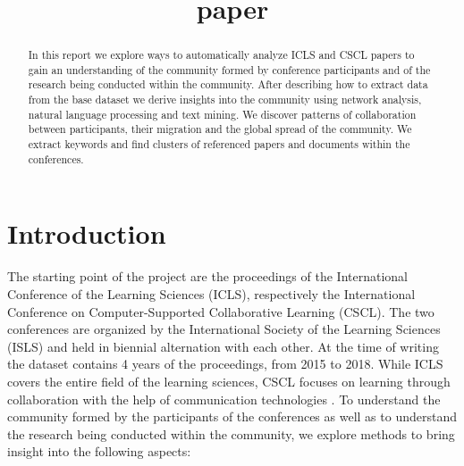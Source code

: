 \documentclass[article,twocolumn]{IEEEtran}
\title{paper}
\begin{document}
    
    
    
\renewcommand{\figurename}{Figure}
\captionsetup{labelformat=simple}\title{   }
\author{
}
\maketitle

    
    

    

\begin{abstract}
    In this report we explore ways to automatically analyze ICLS and CSCL
papers to gain an understanding of the community formed by conference
participants and of the research being conducted within the community.
After describing how to extract data from the base dataset we derive
insights into the community using network analysis, natural language
processing and text mining. We discover patterns of collaboration
between participants, their migration and the global spread of the
community. We extract keywords and find clusters of referenced papers
and documents within the conferences.
\end{abstract}
    \hypertarget{introduction}{%
\section{Introduction}\label{introduction}}

The starting point of the project are the proceedings of the
International Conference of the Learning Sciences (ICLS), respectively
the International Conference on Computer-Supported Collaborative
Learning (CSCL). The two conferences are organized by the International
Society of the Learning Sciences (ISLS) and held in biennial alternation
with each other. At the time of writing the dataset contains 4 years of
the proceedings, from 2015 to 2018. While ICLS covers the entire field
of the learning sciences, CSCL focuses on learning through collaboration
with the help of communication technologies \cite{ICLS}. To understand
the community formed by the participants of the conferences as well as
to understand the research being conducted within the community, we
explore methods to bring insight into the following aspects:
\end{document}
